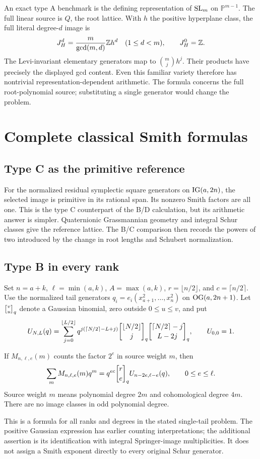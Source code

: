 An exact type A benchmark is the defining representation of $\operatorname{SL}_m$ on $\mathbb P^{m-1}$. The full linear source is $Q$, the root lattice. With $h$ the positive hyperplane class, the full literal degree-$d$ image is
\[
 J_H^d=\frac{m}{\gcd(m,d)}\mathbb Z h^d\quad(1\le d<m),
 \qquad J_H^0=\mathbb Z.
\]
The Levi-invariant elementary generators map to $\binom mj h^j$. Their products have precisely the displayed gcd content. Even this familiar variety therefore has nontrivial representation-dependent arithmetic. The formula concerns the full root-polynomial source; substituting a single generator would change the problem.


\section{Complete classical Smith formulas}
\subsection{Type C as the primitive reference}
For the normalized residual symplectic square generators on $\operatorname{IG}(a,2n)$, the selected image is primitive in its rational span. Its nonzero Smith factors are all one. This is the type C counterpart of the B/D calculation, but its arithmetic answer is simpler. Quaternionic Grassmannian geometry and integral Schur classes give the reference lattice. The B/C comparison then records the powers of two introduced by the change in root lengths and Schubert normalization.

\subsection{Type B in every rank}
Set $n=a+k$, $\ell=\min(a,k)$, $A=\max(a,k)$, $r=\lfloor n/2\rfloor$, and $c=\lceil n/2\rceil$. Use the normalized tail generators $q_i=e_i(x_{a+1}^2,\ldots,x_n^2)$ on $\operatorname{OG}(a,2n+1)$. Let $\gb vu$ denote a Gaussian binomial, zero outside $0\le u\le v$, and put
\[
 U_{N,L}(q)=\sum_{j=0}^{\lfloor L/2\rfloor}
 q^{j(\lceil N/2\rceil-L+j)}
 \gb{\lfloor N/2\rfloor}{j}
 \gb{\lceil N/2\rceil-j}{L-2j},\qquad U_{0,0}=1.
\]
\begin{theorem}
If $M_{n,\ell,e}(m)$ counts the factor $2^e$ in source weight $m$, then
\[
 \sum_m M_{n,\ell,e}(m)q^m
 =q^{ec}\gb re U_{n-2e,\ell-e}(q),\qquad 0\le e\le\ell.
\]
Source weight $m$ means polynomial degree $2m$ and cohomological degree $4m$. There are no image classes in odd polynomial degree.
\end{theorem}
This is a formula for all ranks and degrees in the stated single-tail problem. The positive Gaussian expression has earlier counting interpretations; the additional assertion is its identification with integral Springer-image multiplicities. It does not assign a Smith exponent directly to every original Schur generator.


